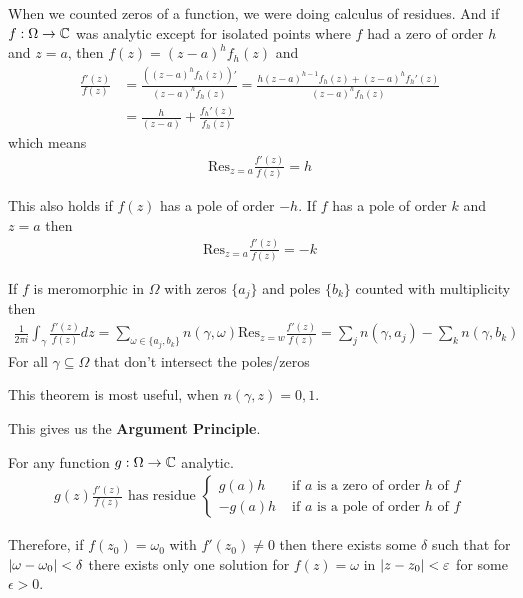 When we counted zeros of a function, we were doing calculus of residues. And if $f: \Omega \to \mathbb{C}$ was analytic except for isolated points where $f$ had a zero of order $h$ and $z = a$, then 
$f(z) = (z-a)^{h}f_h(z)$
and
\begin{align*}
	\frac{f'(z)}{f(z)} &= \frac{\left(
			(z-a)^{h}f_h(z)
	\right)'}{(z-a)^{h}f_h(z)} = \frac{h(z-a)^{h-1}f_h(z) + (z-a)^{h}f_h'(z)}{(z-a)^{h}f_h(z)}\\
										 &= \frac{h}{(z-a)} + \frac{f_h'(z)}{f_h(z)}
\end{align*}
which means
\begin{align*}
	\text{Res}_{z = a} \frac{f'(z)}{f(z)} = h
\end{align*}


This also holds if $f(z)$ has a pole of order $-h$. If $f$ has a pole of order $k$ and $z=a$ then
\begin{align*}
	\text{Res}_{z=a}\frac{f'(z)}{f(z)}= -k
\end{align*}

\begin{theorem}[]
	If $f$ is meromorphic in $\Omega$ with zeros $\{a_j\}$ and poles $\{b_k\}$ counted with multiplicity then
	\begin{align*}
		\frac{1}{2\pi i}\int_{\gamma}\frac{f'(z)}{f(z)}dz = \sum_{\omega \in \{a_j,b_k\}} n(\gamma,\omega) \text{Res}_{z=w} \frac{f'(z)}{f(z)} = \sum_{j}n(\gamma,a_j) - \sum_{k}n(\gamma,b_k)
	\end{align*}
	For all $\gamma \subseteq \Omega$ that don't intersect the poles/zeros
\end{theorem}
This theorem is most useful, when $n(\gamma,z) = 0,1$.

This gives us the \textbf{Argument Principle}.

For any function $g: \Omega \to \mathbb{C}$ analytic. 
\begin{align*}
	g(z) \frac{f'(z)}{f(z)} \text{ has residue } \left\{\begin{array}{ll}
			g(a) h & \text{ if $a$ is a zero of order $h$ of $f$} \\
			-g(a) h& \text{ if $a$ is a pole of order $h$ of $f$}
	\end{array} \right.
\end{align*}

Therefore, if $f(z_0) = \omega_0$ with $f'(z_0) \neq 0$ then there exists some $\delta$ such that
for $\vert\omega - \omega_0\vert < \delta$ there exists only one solution for $f(z) = \omega$ in $\vert z - z_0\vert < \varepsilon$ for some $\epsilon > 0$.

